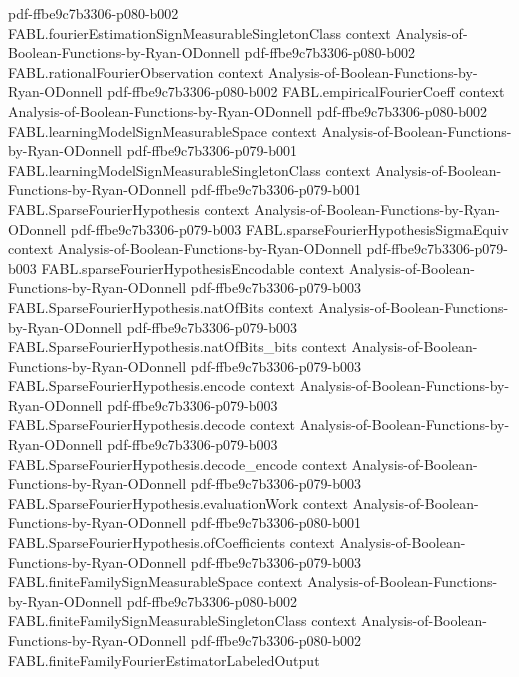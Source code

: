\begin{theorem}
  {pdf-ffbe9c7b3306-p080-b002}
\proofstep
  {FABL.fourierEstimationSignMeasurableSingletonClass}
  {context}
  {Analysis-of-Boolean-Functions-by-Ryan-ODonnell}
  {pdf-ffbe9c7b3306-p080-b002}
\proofstep
  {FABL.rationalFourierObservation}
  {context}
  {Analysis-of-Boolean-Functions-by-Ryan-ODonnell}
  {pdf-ffbe9c7b3306-p080-b002}
\proofstep
  {FABL.empiricalFourierCoeff}
  {context}
  {Analysis-of-Boolean-Functions-by-Ryan-ODonnell}
  {pdf-ffbe9c7b3306-p080-b002}
\proofstep
  {FABL.learningModelSignMeasurableSpace}
  {context}
  {Analysis-of-Boolean-Functions-by-Ryan-ODonnell}
  {pdf-ffbe9c7b3306-p079-b001}
\proofstep
  {FABL.learningModelSignMeasurableSingletonClass}
  {context}
  {Analysis-of-Boolean-Functions-by-Ryan-ODonnell}
  {pdf-ffbe9c7b3306-p079-b001}
\proofstep
  {FABL.SparseFourierHypothesis}
  {context}
  {Analysis-of-Boolean-Functions-by-Ryan-ODonnell}
  {pdf-ffbe9c7b3306-p079-b003}
\proofstep
  {FABL.sparseFourierHypothesisSigmaEquiv}
  {context}
  {Analysis-of-Boolean-Functions-by-Ryan-ODonnell}
  {pdf-ffbe9c7b3306-p079-b003}
\proofstep
  {FABL.sparseFourierHypothesisEncodable}
  {context}
  {Analysis-of-Boolean-Functions-by-Ryan-ODonnell}
  {pdf-ffbe9c7b3306-p079-b003}
\proofstep
  {FABL.SparseFourierHypothesis.natOfBits}
  {context}
  {Analysis-of-Boolean-Functions-by-Ryan-ODonnell}
  {pdf-ffbe9c7b3306-p079-b003}
\proofstep
  {FABL.SparseFourierHypothesis.natOfBits_bits}
  {context}
  {Analysis-of-Boolean-Functions-by-Ryan-ODonnell}
  {pdf-ffbe9c7b3306-p079-b003}
\proofstep
  {FABL.SparseFourierHypothesis.encode}
  {context}
  {Analysis-of-Boolean-Functions-by-Ryan-ODonnell}
  {pdf-ffbe9c7b3306-p079-b003}
\proofstep
  {FABL.SparseFourierHypothesis.decode}
  {context}
  {Analysis-of-Boolean-Functions-by-Ryan-ODonnell}
  {pdf-ffbe9c7b3306-p079-b003}
\proofstep
  {FABL.SparseFourierHypothesis.decode_encode}
  {context}
  {Analysis-of-Boolean-Functions-by-Ryan-ODonnell}
  {pdf-ffbe9c7b3306-p079-b003}
\proofstep
  {FABL.SparseFourierHypothesis.evaluationWork}
  {context}
  {Analysis-of-Boolean-Functions-by-Ryan-ODonnell}
  {pdf-ffbe9c7b3306-p080-b001}
\proofstep
  {FABL.SparseFourierHypothesis.ofCoefficients}
  {context}
  {Analysis-of-Boolean-Functions-by-Ryan-ODonnell}
  {pdf-ffbe9c7b3306-p079-b003}
\proofstep
  {FABL.finiteFamilySignMeasurableSpace}
  {context}
  {Analysis-of-Boolean-Functions-by-Ryan-ODonnell}
  {pdf-ffbe9c7b3306-p080-b002}
\proofstep
  {FABL.finiteFamilySignMeasurableSingletonClass}
  {context}
  {Analysis-of-Boolean-Functions-by-Ryan-ODonnell}
  {pdf-ffbe9c7b3306-p080-b002}
\proofstep
  {FABL.finiteFamilyFourierEstimatorLabeledOutput}

\end{theorem}
